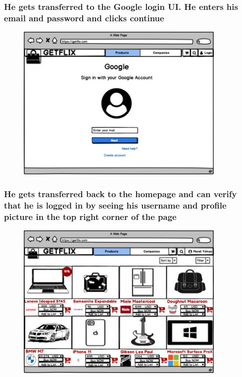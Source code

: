 \documentclass[]{article}
\begin{document}
\hypertarget{he-gets-transferred-to-the-google-login-ui.-he-enters-his-email-and-password-and-clicks-continue}{%
    \subsubsection{He gets transferred to the Google login UI. He enters his
        email and password and clicks
        continue}\label{he-gets-transferred-to-the-google-login-ui.-he-enters-his-email-and-password-and-clicks-continue}}

\begin{figure}[H]
    \centering
    \includegraphics[height=3in]{./images/35.jpg}
\end{figure}

\hypertarget{he-gets-transferred-back-to-the-homepage-and-can-verify-that-he-is-logged-in-by-seeing-his-username-and-profile-picture-in-the-top-right-corner-of-the-page}{%
    \subsubsection{He gets transferred back to the homepage and can verify
        that he is logged in by seeing his username and profile picture in the
        top right corner of the
        page}\label{he-gets-transferred-back-to-the-homepage-and-can-verify-that-he-is-logged-in-by-seeing-his-username-and-profile-picture-in-the-top-right-corner-of-the-page}}

\begin{figure}[H]
    \centering
    \includegraphics[height=3in]{./images/36.jpg}
\end{figure}
\end{document}
